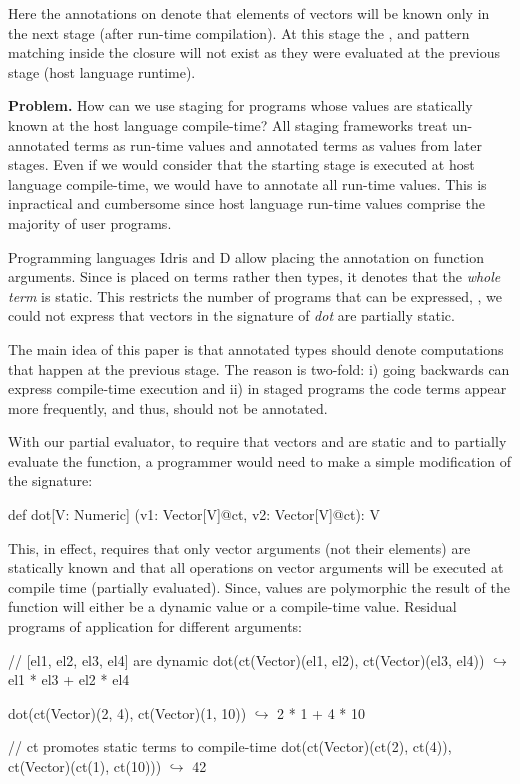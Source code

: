 Here the  annotations on  denote that elements of vectors will be known
 only in the next stage (after run-time compilation). At this stage the 
 , and pattern matching inside the closure will not exist
 as they were evaluated at the previous stage (host language runtime).


{\bf Problem.} How can we use staging for programs whose values are statically
known at the host language compile-time? All staging frameworks treat un-annotated
terms as run-time values and annotated terms as values from later stages. Even if we would
consider that the starting stage is executed at host language compile-time, we would
have to annotate all run-time values. This is inpractical and cumbersome since host
language run-time values comprise the majority of user programs.


Programming languages Idris and D allow placing the 
 annotation on function arguments. Since  is placed on terms rather
 then types, it denotes that the \emph{whole term} is static. This restricts the number of programs
 that can be expressed, \eg, we could not express that vectors in the signature of \emph{dot}
 are partially static.

The main idea of this paper is that annotated types should denote computations
that happen at the previous stage. The reason is two-fold: i) going backwards can
express compile-time execution and ii) in staged programs the code terms appear
more frequently, and thus, should not be annotated.

With our partial evaluator, to require that vectors  and  are
 static and to partially evaluate the function, a programmer would need to make
 a simple modification of the  signature:\begin{lstparagraph}
  def dot[V: Numeric]
    (v1: Vector[V]@ct, v2: Vector[V]@ct): V
\end{lstparagraph}

This, in effect, requires that only vector arguments (not their elements) are
 statically known and that all operations on vector arguments will be executed
 at compile time (partially evaluated). Since, values are polymorphic the result
 of the function will either be a dynamic value or a compile-time value. Residual
 programs of  application for different arguments:

\vspace{1.8mm}
\begin{listing}[mathescape]
  // [el1, el2, el3, el4] are dynamic
  dot(ct(Vector)(el1, el2), ct(Vector)(el3, el4))
    $\hookrightarrow$ el1 * el3 + el2 * el4

  dot(ct(Vector)(2, 4), ct(Vector)(1, 10))
    $\hookrightarrow$ 2 * 1 + 4 * 10

  // ct promotes static terms to compile-time
  dot(ct(Vector)(ct(2), ct(4)), ct(Vector)(ct(1), ct(10)))
    $\hookrightarrow$ 42
\end{listing}
\vspace{1.8mm}


